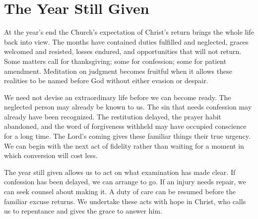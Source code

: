 \section{The Year Still Given}

At the year's end the Church's expectation of Christ's return brings the whole life back into view. The months have contained duties fulfilled and neglected, graces welcomed and resisted, losses endured, and opportunities that will not return. Some matters call for thanksgiving; some for confession; some for patient amendment. Meditation on judgment becomes fruitful when it allows these realities to be named before God without either evasion or despair.

We need not devise an extraordinary life before we can become ready. The neglected person may already be known to us. The sin that needs confession may already have been recognized. The restitution delayed, the prayer habit abandoned, and the word of forgiveness withheld may have occupied conscience for a long time. The Lord's coming gives these familiar things their true urgency. We can begin with the next act of fidelity rather than waiting for a moment in which conversion will cost less.

The year still given allows us to act on what examination has made clear. If confession has been delayed, we can arrange to go. If an injury needs repair, we can seek counsel about making it. A duty of care can be resumed before the familiar excuse returns. We undertake these acts with hope in Christ, who calls us to repentance and gives the grace to answer him.

